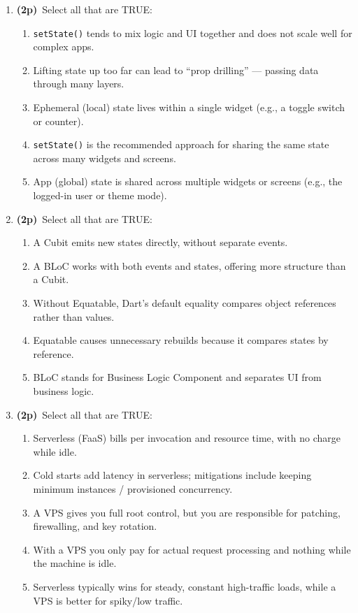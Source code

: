 \documentclass[11pt]{article}
\newcommand{\pts}{\textbf{(2p)}~}
\begin{document}
\begin{enumerate}
    \item \pts Select all that are TRUE:
    \begin{enumerate}
      \item \texttt{setState()} tends to mix logic and UI together and does not scale well for complex apps.
      \item Lifting state up too far can lead to ``prop drilling'' --- passing data through many layers.
      \item Ephemeral (local) state lives within a single widget (e.g., a toggle switch or counter).
      \item \texttt{setState()} is the recommended approach for sharing the same state across many widgets and screens.
      \item App (global) state is shared across multiple widgets or screens (e.g., the logged-in user or theme mode).
    \end{enumerate}

    \item \pts Select all that are TRUE:
    \begin{enumerate}
      \item A Cubit emits new states directly, without separate events.
      \item A BLoC works with both events and states, offering more structure than a Cubit.
      \item Without Equatable, Dart's default equality compares object references rather than values.
      \item Equatable causes unnecessary rebuilds because it compares states by reference.
      \item BLoC stands for Business Logic Component and separates UI from business logic.
    \end{enumerate}

    \item \pts Select all that are TRUE:
    \begin{enumerate}
      \item Serverless (FaaS) bills per invocation and resource time, with no charge while idle.
      \item Cold starts add latency in serverless; mitigations include keeping minimum instances / provisioned concurrency.
      \item A VPS gives you full root control, but you are responsible for patching, firewalling, and key rotation.
      \item With a VPS you only pay for actual request processing and nothing while the machine is idle.
      \item Serverless typically wins for steady, constant high-traffic loads, while a VPS is better for spiky/low traffic.
    \end{enumerate}


\end{enumerate}
\end{document}
